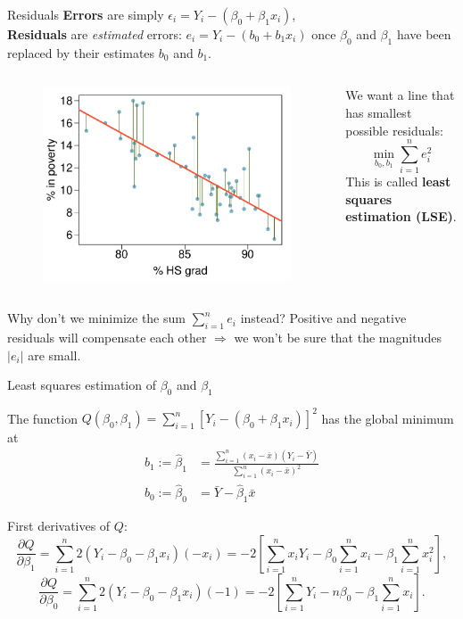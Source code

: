 \documentclass{beamer}
\begin{document}
\begin{frame}{Residuals}
\textbf{Errors} are simply $\epsilon_i=Y_i-(\beta_0+\beta_1x_i)$,\\
\pause\textbf{Residuals} are \textit{estimated} errors: $e_i=Y_i-(b_0+b_1 x_i)$ once $\beta_0$ and $\beta_1$ have been replaced by their estimates $b_0$ and $b_1$.
\begin{columns}
\begin{column}{.5\textwidth}
\begin{figure}
    \centering
    \includegraphics[width=\textwidth]{plots/poverty_hsgrad_res.pdf}
\end{figure}
\end{column}
\begin{column}{.5\textwidth}
\pause We want a line that has smallest possible residuals:
$$
\min_{b_0,b_1}\sum_{i=1}^n e_i^2
$$
\pause This is called \textbf{least squares estimation (LSE)}. 
\end{column}
\end{columns}
\pause Why don't we minimize the sum $\sum_{i=1}^n e_i$ instead? \pause Positive and negative residuals will compensate each other $\Rightarrow$ we won't be sure that the magnitudes $|e_i|$ are small.
\end{frame}

\begin{frame}{Least squares estimation of $\beta_0$ and $\beta_1$}
\begin{theorem}
The function $Q(\beta_0, \beta_1)=\sum_{i=1}^n[Y_i-(\beta_0+\beta_1 x_i)]^2$ has the global minimum at
\begin{align*}
b_1:=\hat\beta_1&=\frac{\sum_{i=1}^n(x_i-\bar{x})(Y_i-\bar{Y})}{\sum_{i=1}^n(x_i-\bar{x})^2}\\
b_0:=\hat\beta_0&=\bar{Y}-\hat\beta_1\bar{x}
\end{align*}
\end{theorem}
\pause{} First derivatives of $Q$:
$$
\frac{\partial Q}{\partial\beta_1}=\sum_{i=1}^n2(Y_i-\beta_0-\beta_1x_i)(-x_i)=-2\left[\sum_{i=1}^n x_i Y_i-\beta_0\sum_{i=1}^n x_i - \beta_1\sum_{i=1}^n x_i^2\right],
$$
\pause $$
\frac{\partial Q}{\partial\beta_0}=\sum_{i=1}^n 2(Y_i-\beta_0-\beta_1 x_i)(-1)=-2\left[\sum_{i=1}^n Y_i-n\beta_0-\beta_1\sum_{i=1}^n x_i\right].
$$
\end{frame}
\end{document}
